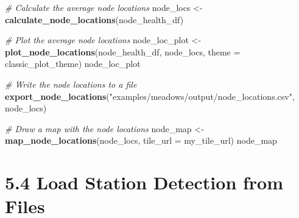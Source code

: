 \documentclass[
]{book}
\newenvironment{Shaded}{\begin{snugshade}}{\end{snugshade}}
\newcommand{\AttributeTok}[1]{\textcolor[rgb]{0.13,0.29,0.53}{#1}}
\newcommand{\CommentTok}[1]{\textcolor[rgb]{0.56,0.35,0.01}{\textit{#1}}}
\newcommand{\FunctionTok}[1]{\textcolor[rgb]{0.13,0.29,0.53}{\textbf{#1}}}
\newcommand{\NormalTok}[1]{#1}
\newcommand{\OtherTok}[1]{\textcolor[rgb]{0.56,0.35,0.01}{#1}}
\newcommand{\StringTok}[1]{\textcolor[rgb]{0.31,0.60,0.02}{#1}}
\begin{document}
\begin{Shaded}
\begin{Highlighting}[]
\CommentTok{\# Calculate the average node locations}
\NormalTok{node\_locs }\OtherTok{\textless{}{-}} \FunctionTok{calculate\_node\_locations}\NormalTok{(node\_health\_df)}

\CommentTok{\# Plot the average node locations}
\NormalTok{node\_loc\_plot }\OtherTok{\textless{}{-}} \FunctionTok{plot\_node\_locations}\NormalTok{(node\_health\_df, }
\NormalTok{                                     node\_locs,}
                                     \AttributeTok{theme =}\NormalTok{ classic\_plot\_theme)}
\NormalTok{node\_loc\_plot}

\CommentTok{\# Write the node locations to a file}
\FunctionTok{export\_node\_locations}\NormalTok{(}\StringTok{"examples/meadows/output/node\_locations.csv"}\NormalTok{, }
\NormalTok{                      node\_locs)}

\CommentTok{\# Draw a map with the node locations}
\NormalTok{node\_map }\OtherTok{\textless{}{-}} \FunctionTok{map\_node\_locations}\NormalTok{(node\_locs, }
                               \AttributeTok{tile\_url =}\NormalTok{ my\_tile\_url)}
\NormalTok{node\_map}
\end{Highlighting}
\end{Shaded}

\section{5.4 Load Station Detection from Files}\label{load-station-detection-from-files}
\end{document}
